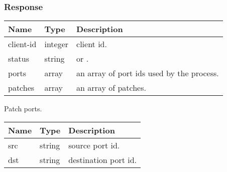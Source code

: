\documentclass[a4paper,11pt,openany,oneside,english]{sphinxmanual}
\begin{document}
\subsubsection{Response}
\label{\detokenize{api_ref/spp_nfv:response}}

\begin{savenotes}\sphinxattablestart
\centering
{}
\sphinxthecaptionisattop
{}\label{\detokenize{api_ref/spp_nfv:id24}}\label{\detokenize{api_ref/spp_nfv:table-spp-ctl-spp-nfv-res}}
\sphinxaftertopcaption
\begin{tabulary}{\linewidth}[t]{|T|T|T|}
\hline
\sphinxstyletheadfamily 
Name
&\sphinxstyletheadfamily 
Type
&\sphinxstyletheadfamily 
Description
\\
\hline
client-id
&
integer
&
client id.
\\
\hline
status
&
string
&
 or .
\\
\hline
ports
&
array
&
an array of port ids used by the process.
\\
\hline
patches
&
array
&
an array of patches.
\\
\hline
\end{tabulary}
\par
\sphinxattableend\end{savenotes}

Patch ports.


\begin{savenotes}\sphinxattablestart
\centering
{}
\sphinxthecaptionisattop
{}\label{\detokenize{api_ref/spp_nfv:id25}}\label{\detokenize{api_ref/spp_nfv:table-spp-ctl-patch-spp-nfv}}
\sphinxaftertopcaption
\begin{tabulary}{\linewidth}[t]{|T|T|T|}
\hline
\sphinxstyletheadfamily 
Name
&\sphinxstyletheadfamily 
Type
&\sphinxstyletheadfamily 
Description
\\
\hline
src
&
string
&
source port id.
\\
\hline
dst
&
string
&
destination port id.
\\
\hline
\end{tabulary}
\par
\sphinxattableend\end{savenotes}
\end{document}
